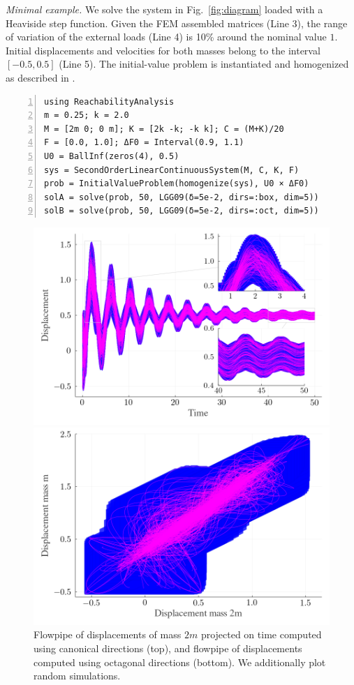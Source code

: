 \documentclass{juliacon}
\begin{document}
\noindent \emph{Minimal example.} We solve the system in Fig.~\ref{fig:diagram} loaded with a Heaviside step function.
%
Given the FEM assembled matrices (Line 3), the range of variation of the external loads (Line 4) is 10\% around the nominal value $1$.
%
Initial displacements and velocities for both masses belong to the interval $[-0.5, 0.5]$ (Line 5).
%
The initial-value problem is instantiated and homogenized as described in \cite{forets2021combining}.

\begin{lstlisting}[label=ejemplo, numbers=left, aboveskip=-0.2cm, belowskip=0.8mm]
using ReachabilityAnalysis
m = 0.25; k = 2.0
M = [2m 0; 0 m]; K = [2k -k; -k k]; C = (M+K)/20
F = [0.0, 1.0]; ΔF0 = Interval(0.9, 1.1)
U0 = BallInf(zeros(4), 0.5)
sys = SecondOrderLinearContinuousSystem(M, C, K, F)
prob = InitialValueProblem(homogenize(sys), U0 × ΔF0)
solA = solve(prob, 50, LGG09(δ=5e-2, dirs=:box, dim=5))
solB = solve(prob, 50, LGG09(δ=5e-2, dirs=:oct, dim=5))
\end{lstlisting}

\begin{figure}[tb!]
	\centering
	\includegraphics[width=0.8\linewidth,keepaspectratio]{example/displacement_vs_time}
	
	\includegraphics[width=0.8\linewidth,keepaspectratio]{example/displacement_vs_displacement}
	\caption{Flowpipe of displacements of mass $2m$ projected on time computed using canonical directions  (top), and flowpipe of displacements computed using octagonal directions (bottom). We additionally plot random simulations.}
	\label{fig:example}
\end{figure}
\end{document}
